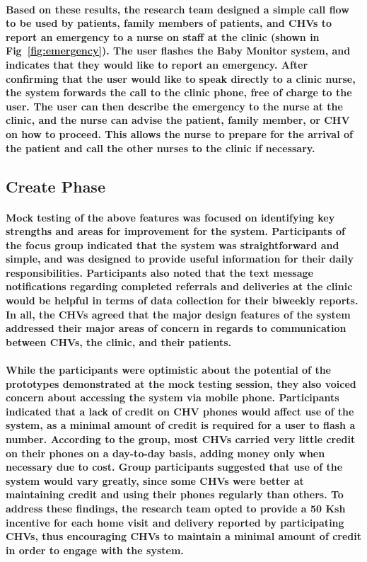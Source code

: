 \paragraph{Based on these results, the research team designed a simple call flow to be used by patients, family members of patients, and CHVs to report an emergency to a nurse on staff at the clinic (shown in Fig~\ref{fig:emergency}). The user flashes the Baby Monitor system, and indicates that they would like to report an emergency. After confirming that the user would like to speak directly to a clinic nurse, the system forwards the call to the clinic phone, free of charge to the user. The user can then describe the emergency to the nurse at the clinic, and the nurse can advise the patient, family member, or CHV on how to proceed. This allows the nurse to prepare for the arrival of the patient and call the other nurses to the clinic if necessary.}

\subsection{Create Phase}
\paragraph{Mock testing of the above features was focused on identifying key strengths and areas for improvement for the system. Participants of the focus group indicated that the system was straightforward and simple, and was designed to provide useful information for their daily responsibilities. Participants also noted that the text message notifications regarding completed referrals and deliveries at the clinic would be helpful in terms of data collection for their biweekly reports. In all, the CHVs agreed that the major design features of the system addressed their major areas of concern in regards to communication between CHVs, the clinic, and their patients.}

\paragraph{While the participants were optimistic about the potential of the prototypes demonstrated at the mock testing session, they also voiced concern about accessing the system via mobile phone. Participants indicated that a lack of credit on CHV phones would affect use of the system, as a minimal amount of credit is required for a user to flash a number. According to the group, most CHVs carried very little credit on their phones on a day-to-day basis, adding money only when necessary due to cost. Group participants suggested that use of the system would vary greatly, since some CHVs were better at maintaining credit and using their phones regularly than others. To address these findings, the research team opted to provide a 50 Ksh incentive for each home visit and delivery reported by participating CHVs, thus encouraging CHVs to maintain a minimal amount of credit in order to engage with the system.}


